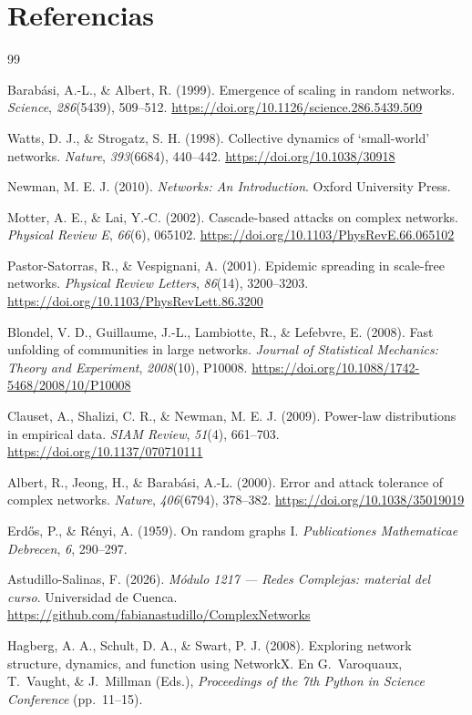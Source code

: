 \documentclass[12pt, a4paper]{article}
\begin{document}
\section*{Referencias}
\begin{thebibliography}{99}

Barabási, A.-L., \& Albert, R. (1999).
Emergence of scaling in random networks.
\textit{Science}, \textit{286}(5439), 509--512.
\url{https://doi.org/10.1126/science.286.5439.509}

Watts, D. J., \& Strogatz, S. H. (1998).
Collective dynamics of `small-world' networks.
\textit{Nature}, \textit{393}(6684), 440--442.
\url{https://doi.org/10.1038/30918}

Newman, M. E. J. (2010).
\textit{Networks: An Introduction}.
Oxford University Press.

Motter, A. E., \& Lai, Y.-C. (2002).
Cascade-based attacks on complex networks.
\textit{Physical Review E}, \textit{66}(6), 065102.
\url{https://doi.org/10.1103/PhysRevE.66.065102}

Pastor-Satorras, R., \& Vespignani, A. (2001).
Epidemic spreading in scale-free networks.
\textit{Physical Review Letters}, \textit{86}(14), 3200--3203.
\url{https://doi.org/10.1103/PhysRevLett.86.3200}

Blondel, V. D., Guillaume, J.-L., Lambiotte, R., \& Lefebvre, E. (2008).
Fast unfolding of communities in large networks.
\textit{Journal of Statistical Mechanics: Theory and Experiment},
\textit{2008}(10), P10008.
\url{https://doi.org/10.1088/1742-5468/2008/10/P10008}

Clauset, A., Shalizi, C. R., \& Newman, M. E. J. (2009).
Power-law distributions in empirical data.
\textit{SIAM Review}, \textit{51}(4), 661--703.
\url{https://doi.org/10.1137/070710111}

Albert, R., Jeong, H., \& Barabási, A.-L. (2000).
Error and attack tolerance of complex networks.
\textit{Nature}, \textit{406}(6794), 378--382.
\url{https://doi.org/10.1038/35019019}

Erdős, P., \& Rényi, A. (1959).
On random graphs I.
\textit{Publicationes Mathematicae Debrecen}, \textit{6}, 290--297.

Astudillo-Salinas, F. (2026).
\textit{Módulo 1217 --- Redes Complejas: material del curso}.
Universidad de Cuenca.
\url{https://github.com/fabianastudillo/ComplexNetworks}

Hagberg, A. A., Schult, D. A., \& Swart, P. J. (2008).
Exploring network structure, dynamics, and function using NetworkX.
En G.~Varoquaux, T.~Vaught, \& J.~Millman (Eds.),
\textit{Proceedings of the 7th Python in Science Conference} (pp.~11--15).

\end{thebibliography}
\end{document}
